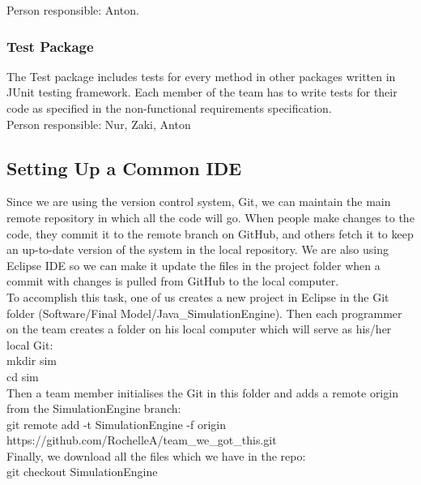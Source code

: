 \documentclass{article}
\begin{document}
	\noindent
	Person responsible: Anton.
	
	\subsubsection{Test Package}
	The Test package includes tests for every method in other packages written in JUnit testing framework. 
	Each member of the team has to write  tests for their code as specified in the non-functional requirements specification.\\
	
	\noindent
	Person responsible: Nur, Zaki, Anton
	
	\subsection{Setting Up a Common IDE}
	
	Since we are using the version control system, Git, we can maintain the main remote repository in which all the code will go. 
	When people make changes to the code, they commit it to the remote branch on GitHub, and others fetch it to keep an up-to-date version of the system in the local repository. 
	We are also using Eclipse IDE so we can make it update the files in the project folder when a commit with changes is pulled from GitHub to the local computer.\\
	
	\noindent
	To accomplish this task, one of us creates a new project in Eclipse in the Git folder (Software/Final Model/Java\_SimulationEngine). 
	Then each programmer on the team creates a folder on his local computer which will serve as his/her local Git:\\
	
	mkdir sim\\
	
	cd sim\\
	
	\noindent
	Then a team member initialises the Git in this folder and adds a remote origin from the SimulationEngine branch:\\
	
	\noindent
	git remote add -t SimulationEngine -f origin https://github.com/RochelleA/team\_we\_got\_this.git\\
	
	\noindent
	Finally, we download all the files which we have in the repo:\\
	
	\noindent
	git checkout SimulationEngine\\
	
\end{document}
